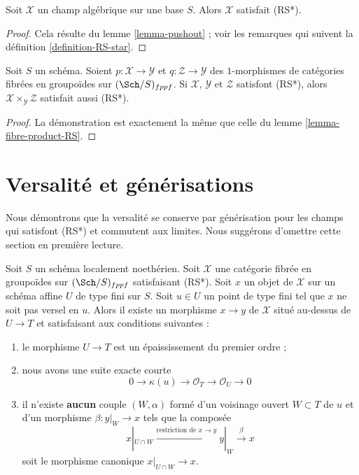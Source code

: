 \begin{lemma}
\label{lemma-algebraic-stack-RS-star}
Soit $\mathcal{X}$ un champ algébrique sur une base $S$. Alors $\mathcal{X}$
satisfait (RS*).
\end{lemma}

\begin{proof}
Cela résulte du lemme \ref{lemma-pushout} ; voir les remarques qui suivent la
définition \ref{definition-RS-star}.
\end{proof}

\begin{lemma}
\label{lemma-fibre-product-RS-star}
Soit $S$ un schéma. Soient $p : \mathcal{X} \to \mathcal{Y}$ et
$q : \mathcal{Z} \to \mathcal{Y}$ des $1$-morphismes de catégories fibrées
en groupoïdes sur $(\Sch/S)_{fppf}$. Si $\mathcal{X}$, $\mathcal{Y}$ et
$\mathcal{Z}$ satisfont (RS*), alors
$\mathcal{X} \times_\mathcal{Y} \mathcal{Z}$ satisfait aussi (RS*).
\end{lemma}

\begin{proof}
La démonstration est exactement la même que celle du lemme
\ref{lemma-fibre-product-RS}.
\end{proof}








\section{Versalité et générisations}
\label{section-generalize-versality}

\noindent
Nous démontrons que la versalité se conserve par générisation pour les champs
qui satisfont (RS*) et commutent aux limites. Nous suggérons d'omettre cette
section en première lecture.

\begin{lemma}
\label{lemma-single-point}
Soit $S$ un schéma localement noethérien. Soit $\mathcal{X}$ une catégorie
fibrée en groupoïdes sur $(\Sch/S)_{fppf}$ satisfaisant (RS*). Soit $x$ un
objet de $\mathcal{X}$ sur un schéma affine $U$ de type fini sur $S$. Soit
$u \in U$ un point de type fini tel que $x$ ne soit pas versel en $u$. Alors
il existe un morphisme $x \to y$ de $\mathcal{X}$ situé au-dessus de
$U \to T$ et satisfaisant aux conditions suivantes :
\begin{enumerate}
\item le morphisme $U \to T$ est un épaississement du premier ordre ;
\item nous avons une suite exacte courte
$$
0 \to \kappa(u) \to \mathcal{O}_T \to \mathcal{O}_U \to 0
$$
\item il n'existe {\bf aucun} couple $(W, \alpha)$ formé d'un voisinage ouvert
$W \subset T$ de $u$ et d'un morphisme $\beta : y|_W \to x$ tels que la
composée
$$
x|_{U \cap W} \xrightarrow{\text{restriction de }x \to y}
y|_W \xrightarrow{\beta} x
$$
soit le morphisme canonique $x|_{U \cap W} \to x$.
\end{enumerate}
\end{lemma}

